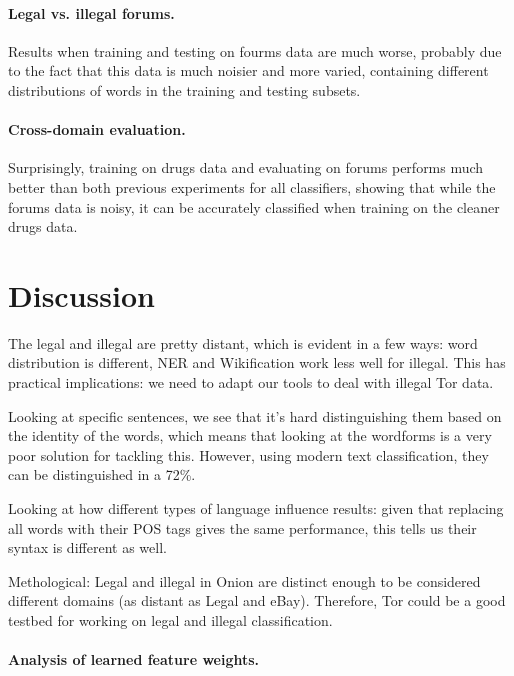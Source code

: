 \documentclass[11pt,a4paper,table]{article}
\begin{document}
\paragraph{Legal vs. illegal forums.}

Results when training and testing on fourms data are much worse,
probably due to the fact that this data is much noisier and more varied,
containing different distributions of words in the training and testing
subsets.

\paragraph{Cross-domain evaluation.}

Surprisingly, training on drugs data and evaluating on forums performs much
better than both previous experiments for all classifiers,
showing that while the forums data is noisy, it can be accurately classified
when training on the cleaner drugs data.


\section{Discussion}

The legal and illegal are pretty distant, which is evident in a few ways: word distribution is different, NER and Wikification work less well
for illegal. This has practical implications: we need to adapt our tools to deal with illegal Tor data. 

Looking at specific sentences, we see that it's hard distinguishing them based on the identity of the words, which means that
looking at the wordforms is a very poor solution for tackling this. However, using modern text classification, they can be distinguished
in a 72\%. 

Looking at how different types of language influence results: given that replacing all words with their POS tags gives
the same performance, this tells us their syntax is different as well.

Methological: Legal and illegal in Onion are distinct enough to be considered different domains (as distant as Legal and eBay). 
Therefore, Tor could be a good testbed for working on legal and illegal classification.

\paragraph{Analysis of learned feature weights.}
\end{document}
